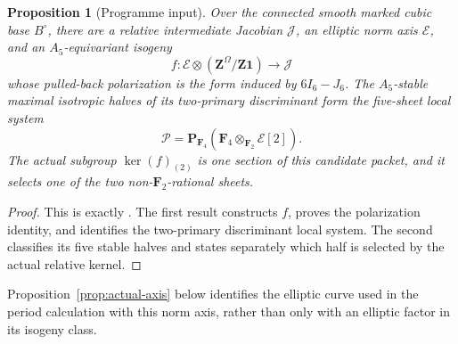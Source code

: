 \documentclass[11pt]{article}
\numberwithin{equation}{section}
\newtheorem{proposition}[theorem]{Proposition}
\theoremstyle{definition}
\theoremstyle{remark}
\newcommand{\F}{\mathbf F}
\newcommand{\PP}{\mathbf P}
\begin{document}
\begin{proposition}[Programme input]\label{prop:programme-input}
Over the connected smooth marked cubic base \(B^\circ\), there are a relative
intermediate Jacobian \(\mathcal J\), an elliptic norm axis \(\mathcal E\), and
an \(A_5\)-equivariant isogeny
\[
 f:\mathcal E\otimes(\mathbf Z^\Omega/\mathbf Z\mathbf1)\longrightarrow
 \mathcal J
\]
whose pulled-back polarization is the form induced by \(6I_6-J_6\).  The
\(A_5\)-stable maximal isotropic halves of its two-primary discriminant form
the five-sheet local system
\begin{equation}\label{eq:packet}
 \mathscr P=\PP_{\F_4}(\F_4\otimes_{\F_2}\mathcal E[2]).
\end{equation}
The actual subgroup \(\ker(f)_{(2)}\) is one section of this candidate packet,
and it selects one of the two non-\(\F_2\)-rational sheets.
\end{proposition}

\begin{proof}
This is exactly \cite[Relative six-axis source and Principal gluing
packet]{RuddEpilogue}.  The first result constructs \(f\), proves the
polarization identity, and identifies the two-primary discriminant local
system.  The second classifies its five stable halves and states separately
which half is selected by the actual relative kernel.
\end{proof}

Proposition~\ref{prop:actual-axis} below identifies the elliptic curve used in
the period calculation with this norm axis, rather than only with an elliptic
factor in its isogeny class.
\end{document}

